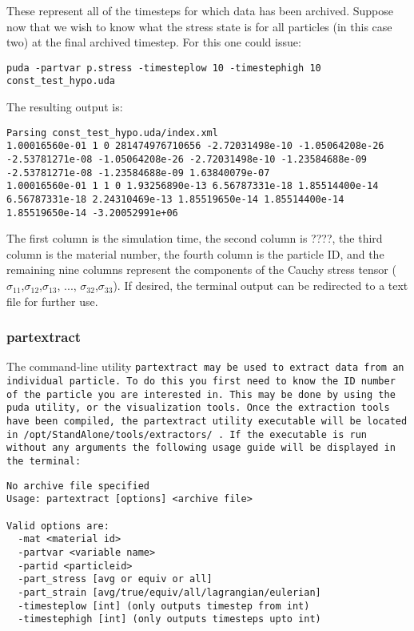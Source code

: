 These represent all of the timesteps for which data has been archived.  Suppose now that we wish to know what the stress state is for all particles (in this case two) at the final archived timestep.  For this one could issue:

\begin{Verbatim}[fontsize=\footnotesize]
puda -partvar p.stress -timesteplow 10 -timestephigh 10 const_test_hypo.uda
\end{Verbatim}

The resulting output is:

\begin{Verbatim}[fontsize=\footnotesize]
Parsing const_test_hypo.uda/index.xml
1.00016560e-01 1 0 281474976710656 -2.72031498e-10 -1.05064208e-26 -2.53781271e-08 -1.05064208e-26 -2.72031498e-10 -1.23584688e-09 -2.53781271e-08 -1.23584688e-09 1.63840079e-07
1.00016560e-01 1 1 0 1.93256890e-13 6.56787331e-18 1.85514400e-14 6.56787331e-18 2.24310469e-13 1.85519650e-14 1.85514400e-14 1.85519650e-14 -3.20052991e+06
\end{Verbatim}

The first column is the simulation time, the second column is ????, the third column is the material number, the fourth column is the particle ID, and the remaining nine columns represent the components of the Cauchy stress tensor ($ \sigma_{11}$,$\sigma_{12}$,$\sigma_{13}$, ..., $\sigma_{32}$,$\sigma_{33}$).  If desired, the terminal output can be redirected to a text file for further use.

\subsubsection{partextract}

The command-line utility \tt partextract \normalfont may be used to extract data from an individual particle.  To do this you first need to know the ID number of the particle you are interested in.  This may be done by using the puda utility, or the visualization tools.  Once the extraction tools have been compiled, the partextract utility executable will be located in  \tt /opt/StandAlone/tools/extractors/ \normalfont.  If the executable is run without any arguments the following usage guide will be displayed in the terminal:

\begin{Verbatim}[fontsize=\footnotesize]
No archive file specified
Usage: partextract [options] <archive file>

Valid options are:
  -mat <material id>
  -partvar <variable name>
  -partid <particleid>
  -part_stress [avg or equiv or all]
  -part_strain [avg/true/equiv/all/lagrangian/eulerian]
  -timesteplow [int] (only outputs timestep from int)
  -timestephigh [int] (only outputs timesteps upto int)
\end{Verbatim}

